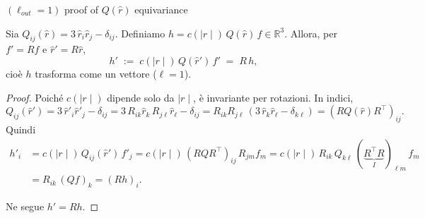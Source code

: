\documentclass[aspectratio=32,8pt]{beamer}
\begin{document}
\begin{frame}{$(\ell_{out}=1)$ proof of $Q(\hat{r})$ equivariance }
\tiny
\begin{lemma}
Sia $Q_{ij}(\hat r)=3\,\hat r_i \hat r_j - \delta_{ij}$. Definiamo $h=c(\mid r \mid)\,Q(\hat r)\,f\in\mathbb R^3$.
Allora, per $f' = R f$ e $\hat r' = R \hat r$,
\[
h' \;:=\; c(\mid r \mid)\,Q(\hat r')\,f' \;=\; R\,h,
\]
cio\`e $h$ trasforma come un vettore ($\ell=1$).
\end{lemma}

\begin{proof}
Poich\'e $c(\mid r \mid)$ dipende solo da $\mid r \mid$, \`e invariante per rotazioni. In indici,
\[
Q_{ij}(\hat r') = 3\,\hat r'_i \hat r'_j - \delta_{ij}
= 3\,R_{ik}\hat r_k\, R_{j\ell}\hat r_\ell - \delta_{ij}
= R_{ik} R_{j\ell}\,(3\,\hat r_k \hat r_\ell - \delta_{k\ell})
= (R Q(\hat r) R^\top)_{ij}.
\]
Quindi
\begin{align}\nonumber
h'_i
&= c(\mid r \mid)\,Q_{ij}(\hat r')\,f'_j
= c(\mid r \mid)\,(R Q R^\top)_{ij}\,R_{jm} f_m
= c(\mid r \mid)\,R_{ik}\,Q_{k\ell}\,(\underbrace{R^\top R}_{I})_{\ell m}\,f_m
\\ &=R_{ik}\,(Q f)_k
= (R h)_i.\nonumber
\end{align}

Ne segue $h' = R h$.
\end{proof}

    
\end{frame}
\end{document}
